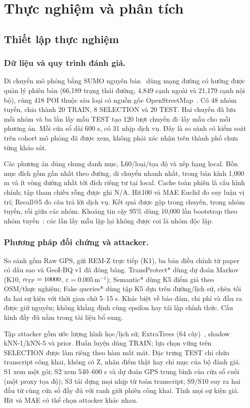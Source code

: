 \section{Thực nghiệm và phân tích}\label{sec:evaluation}
\subsection{Thiết lập thực nghiệm}
\subsubsection{Dữ liệu và quy trình đánh giá.}

Di chuyển mô phỏng bằng SUMO nguyên bản~\cite{sumo} dùng mạng đường có hướng
được quản lý phiên bản (66,189 trạng thái đường, 4,849 cạnh ngoài và 21,179
cạnh nội bộ), cùng 418 POI thuộc sáu loại có nguồn gốc
OpenStreetMap~\cite{osm}. Có 48 nhóm tuyến, chia thành 20 TRAIN, 8 SELECTION
và 20 TEST. Hai chuyến đã lưu mỗi nhóm và ba lần lấy mẫu TEST tạo 120 lượt
chuyến đi--lấy mẫu cho mỗi phương án. Mỗi cửa sổ dài 600 s, có 31 nhịp dịch
vụ. Đây là so sánh có kiểm soát trên cohort mô phỏng đã được xem, không phải
xác nhận trên thành phố chưa từng khảo sát.

Các phương án dùng chung danh mục, L60/loại/tọa độ và xếp hạng local.
Bốn mục đích gồm gần nhất theo đường, di chuyển nhanh nhất, trong bán kính
1,000 m và ít vòng đường nhất tới đích riêng tư tại local.
Cache toàn phiên là cấu hình chính; tập tham chiếu rỗng được ghi N/A.
Hit100 và MAE Euclid đo suy luận vị trí; Recall@5 đo câu trả lời dịch vụ.
Kết quả được gộp trong chuyến, trong nhóm tuyến, rồi giữa các nhóm.
Khoảng tin cậy 95\% dùng 10,000 lần bootstrap theo nhóm tuyến~\cite{efron};
các lần lấy mẫu lặp lại không được coi là nhóm độc lập.

\subsubsection{Phương pháp đối chứng và attacker.}
So sánh gồm Raw GPS, gửi REM-Z trực tiếp (K1), ba bản điều chỉnh từ paper
có dấu sao và GeoI-BQ v1 đã đóng băng. TransProtect* dùng dự đoán Markov
(K10, $\alpha_{\rm TP}=10000$, $\varepsilon=0.005\,\mathrm m^{-1}$);
Semantic* dùng K5 điểm giả theo OSM/thực nghiệm; Fake queries* dùng tập K5
dựa trên đường/lịch sử, chèn tối đa hai sự kiện với thời gian chờ 5--15 s.
Khác biệt về bảo đảm, chi phí và đầu ra được giữ nguyên; không khẳng định
cùng epsilon hay tái lập chính thức. Cấu hình đầy đủ nằm trong tài liệu bổ sung.

Tập attacker gồm ước lượng hình học/lịch sử, ExtraTrees
(64 cây)~\cite{extratrees}, shadow kNN-1/kNN-5 và prior.
Huấn luyện dùng TRAIN; lựa chọn vững trên SELECTION được làm riêng theo hàm
mất mát. Đặc trưng TEST chỉ chứa transcript công khai, không có Z, nhãn điểm
thật hay chỉ mục của bộ đánh giá. S1 xem một gói; S2 xem 540--600 s và dự đoán
GPS trung bình của cửa sổ cuối (một proxy tọa độ); S3 tái dựng mọi nhịp từ
toàn transcript; S9/S10 suy ra hai đầu từ cùng cửa sổ đầy đủ với ranh giới
phiên công khai. Tính mọi sự kiện giả. Hit và MAE có thể chọn attacker khác nhau.

